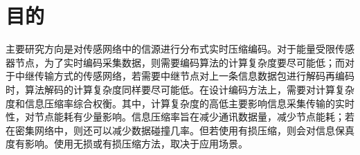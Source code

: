 \section{目的}

主要研究方向是对传感网络中的信源进行分布式实时压缩编码。对于能量受限传感器节点，为了实时编码采集数据，则需要编码算法的计算复杂度要尽可能低；而对于中继传输方式的传感网络，若需要中继节点对上一条信息数据包进行解码再编码时，算法解码的计算复杂度同样要尽可能低。在设计编码方法上，需要对计算复杂度和信息压缩率综合权衡。其中，计算复杂度的高低主要影响信息采集传输的实时性，对节点能耗有少量影响。信息压缩率旨在减少通讯数据量，减少节点能耗；若在密集网络中，则还可以减少数据碰撞几率。但若使用有损压缩，则会对信息保真度有影响。使用无损或有损压缩方法，取决于应用场景。




